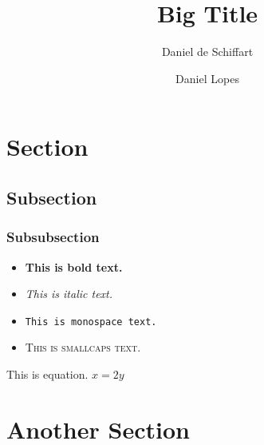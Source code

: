 \documentclass[palatino,english]{ist-report}
\begin{document}
\title{Big Title}
\author{Daniel de Schiffart \and Daniel Lopes}
\makecover{}
\maketitle

\section{Section}

\lipsum[1]

\subsection{Subsection}

\lipsum[1-2]

\subsubsection{Subsubsection}

\begin{itemize}
	\item \textbf{This is bold text.}
	\item \textit{This is italic text.}
	\item \texttt{This is monospace text.}
	\item \textsc{This is smallcaps text.}
\end{itemize}

This is equation. $x = 2y$

\section{Another Section}

\lipsum[1-13]
\end{document}
